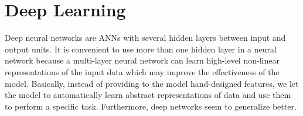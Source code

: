 \section{Deep Learning}
Deep neural networks are ANNs with several hidden layers between input and output units. It is convenient to use more than one hidden layer in a neural network because a multi-layer neural network can learn high-level non-linear representations of the input data which may improve the effectiveness of the model. Basically, instead of providing to the model hand-designed features, we let the model to automatically learn abstract representations of data and use them to perform a specific task. Furthermore, deep networks seem to generalize better.
